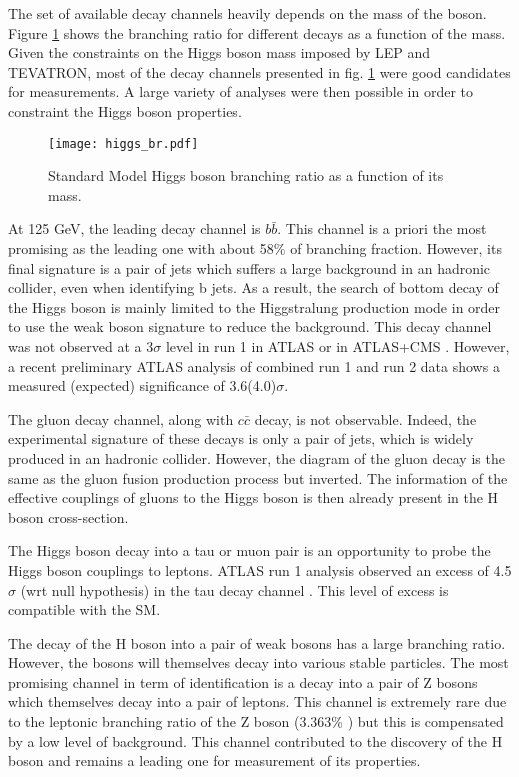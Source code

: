 \begin{enumerate}
The set of available decay channels heavily depends on the mass of the boson.
Figure \ref{fig:org6c93d9f} shows the branching ratio for different decays as a function of the mass.
Given the constraints on the Higgs boson mass imposed by LEP and TEVATRON, most of the decay channels presented in fig. \ref{fig:org6c93d9f} were good candidates for measurements.
A large variety of analyses were then possible in order to constraint the Higgs boson properties.

\begin{figure}[htbp]
\centering
\texttt{[image: higgs\_br.pdf]}
\caption{\label{fig:org6c93d9f}
Standard Model Higgs boson branching ratio as a function of its mass. \cite{CERN-2013-004}}
\end{figure}

At 125 GeV, the leading decay channel is \(b\bar{b}\).
This channel is a priori the most promising as the leading one with about 58\% of branching fraction.
However, its final signature is a pair of jets which suffers a large background in an hadronic collider, even when identifying b jets.
As a result, the search of bottom decay of the Higgs boson is mainly limited to the Higgstralung production mode in order to use the weak boson signature to reduce the background.
This decay channel was not observed at a 3$\sigma$ level in run 1 in ATLAS \cite{ATLAS-CONF-2013-079,CERN-PH-EP-2014-214} or in ATLAS+CMS \cite{CERN-EP-2016-100}.
However, a recent preliminary ATLAS analysis \cite{CERN-EP-2017-175} of combined run 1 and run 2 data shows a measured (expected) significance of 3.6(4.0)$\sigma$.

The gluon decay channel, along with \(c\bar{c}\) decay, is not observable.
Indeed, the experimental signature of these decays is only a pair of jets, which is widely produced in an hadronic collider.
However, the diagram of the gluon decay is the same as the gluon fusion production process but inverted.
The information of the effective couplings of gluons to the Higgs boson is then already present in the H boson cross-section.

The Higgs boson decay into a tau or muon pair is an opportunity to probe the Higgs boson couplings to leptons.
ATLAS run 1 analysis observed an excess of 4.5\(\sigma\) (wrt null hypothesis) in the tau decay channel \cite{CERN-PH-EP-2014-262}.
This level of excess is compatible with the SM.

The decay of the H boson into a pair of weak bosons has a large branching ratio.
However, the bosons will themselves decay into various stable particles.
The most promising channel in term of identification is a decay into a pair of Z bosons which themselves decay into a pair of leptons.
This channel is extremely rare due to the leptonic branching ratio of the Z boson (3.363\% \cite{PDG2016}) but this is compensated by a low level of background.
This channel contributed to the discovery of the H boson and remains a leading one for measurement of its properties.



\end{enumerate}
